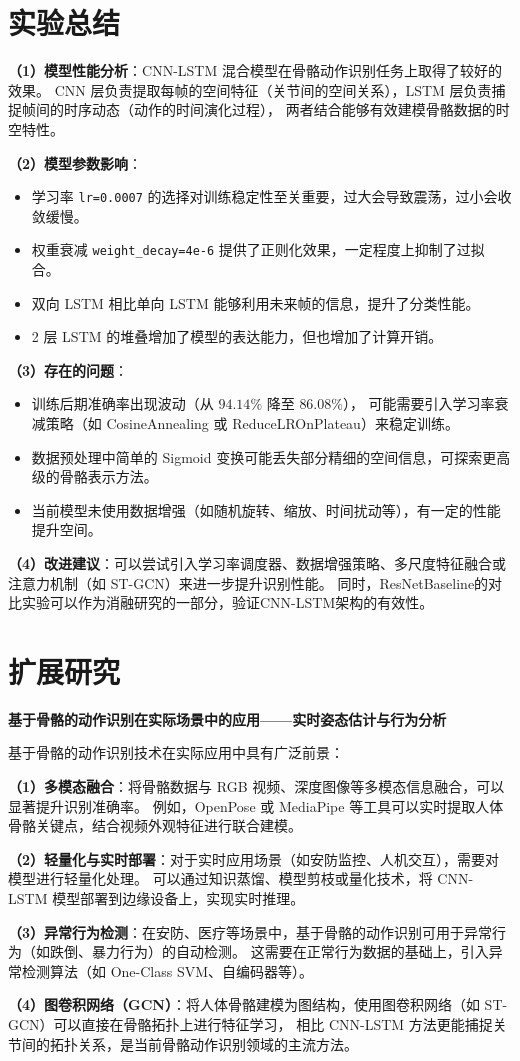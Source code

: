 \documentclass[UTF8]{ctexart}
\begin{document}
\section{实验总结}

\textbf{（1）模型性能分析}：CNN-LSTM 混合模型在骨骼动作识别任务上取得了较好的效果。
CNN 层负责提取每帧的空间特征（关节间的空间关系），LSTM 层负责捕捉帧间的时序动态（动作的时间演化过程），
两者结合能够有效建模骨骼数据的时空特性。

\textbf{（2）模型参数影响}：
\begin{itemize}
  \item 学习率 \texttt{lr=0.0007} 的选择对训练稳定性至关重要，过大会导致震荡，过小会收敛缓慢。
  \item 权重衰减 \texttt{weight\_decay=4e-6} 提供了正则化效果，一定程度上抑制了过拟合。
  \item 双向 LSTM 相比单向 LSTM 能够利用未来帧的信息，提升了分类性能。
  \item 2 层 LSTM 的堆叠增加了模型的表达能力，但也增加了计算开销。
\end{itemize}

\textbf{（3）存在的问题}：
\begin{itemize}
  \item 训练后期准确率出现波动（从 $94.14\%$ 降至 $86.08\%$），
        可能需要引入学习率衰减策略（如 CosineAnnealing 或 ReduceLROnPlateau）来稳定训练。
  \item 数据预处理中简单的 Sigmoid 变换可能丢失部分精细的空间信息，可探索更高级的骨骼表示方法。
  \item 当前模型未使用数据增强（如随机旋转、缩放、时间扰动等），有一定的性能提升空间。
\end{itemize}

\textbf{（4）改进建议}：可以尝试引入学习率调度器、数据增强策略、多尺度特征融合或注意力机制（如 ST-GCN）来进一步提升识别性能。
同时，ResNetBaseline的对比实验可以作为消融研究的一部分，验证CNN-LSTM架构的有效性。

\section{扩展研究}

\textbf{基于骨骼的动作识别在实际场景中的应用——实时姿态估计与行为分析}

基于骨骼的动作识别技术在实际应用中具有广泛前景：

\textbf{（1）多模态融合}：将骨骼数据与 RGB 视频、深度图像等多模态信息融合，可以显著提升识别准确率。
例如，OpenPose 或 MediaPipe 等工具可以实时提取人体骨骼关键点，结合视频外观特征进行联合建模。

\textbf{（2）轻量化与实时部署}：对于实时应用场景（如安防监控、人机交互），需要对模型进行轻量化处理。
可以通过知识蒸馏、模型剪枝或量化技术，将 CNN-LSTM 模型部署到边缘设备上，实现实时推理。

\textbf{（3）异常行为检测}：在安防、医疗等场景中，基于骨骼的动作识别可用于异常行为（如跌倒、暴力行为）的自动检测。
这需要在正常行为数据的基础上，引入异常检测算法（如 One-Class SVM、自编码器等）。

\textbf{（4）图卷积网络（GCN）}：将人体骨骼建模为图结构，使用图卷积网络（如 ST-GCN）可以直接在骨骼拓扑上进行特征学习，
相比 CNN-LSTM 方法更能捕捉关节间的拓扑关系，是当前骨骼动作识别领域的主流方法。
\end{document}
